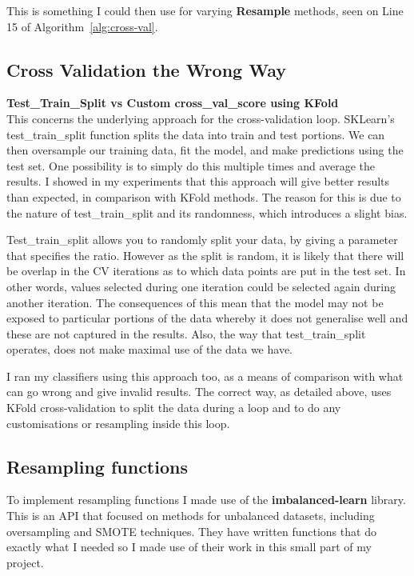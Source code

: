 \documentclass[12pt,a4paper,twoside]{report}
\begin{document}
This is something I could then use for varying \textbf{Resample} methods, seen on Line 15 of Algorithm~\ref{alg:cross-val}.

\subsection{Cross Validation the Wrong Way}

\textbf{Test\_Train\_Split vs Custom cross\_val\_score using KFold}\\
This concerns the underlying approach for the cross-validation loop. SKLearn's test\_train\_split function splits the data into train and test portions. We can then oversample our training data, fit the model, and make predictions using the test set.
One possibility is to simply do this multiple times and average the results.
I showed in my experiments that this approach will give better results than expected, in comparison with KFold methods. The reason for this is due to the nature of test\_train\_split and its randomness, which introduces a slight bias.

Test\_train\_split allows you to randomly split your data, by giving a parameter that specifies the ratio. However as the split is random, it is likely that there will be overlap in the CV iterations as to which data points are put in the test set. In other words, values selected during one iteration could be selected again during another iteration.
The consequences of this mean that the model may not be exposed to particular portions of the data whereby it does not generalise well and these are not captured in the results. Also, the way that test\_train\_split operates, does not make maximal use of the data we have.

I ran my classifiers using this approach too, as a means of comparison with what can go wrong and give invalid results. The correct way, as detailed above, uses KFold cross-validation to split the data during a loop and to do any customisations or resampling inside this loop.

\subsection{Resampling functions}
To implement resampling functions I made use of the \textbf{imbalanced-learn}\cite{JMLR:v18:16-365} library. This is an API that focused on methods for unbalanced datasets, including oversampling and SMOTE techniques. They have written functions that do exactly what I needed so I made use of their work in this small part of my project. 
\end{document}
